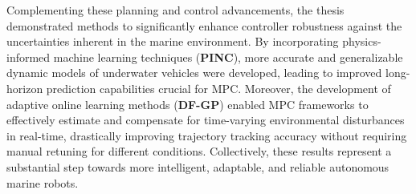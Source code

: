 Complementing these planning and control advancements, the thesis demonstrated methods to significantly enhance controller robustness against the uncertainties inherent in the marine environment. By incorporating physics-informed machine learning techniques (\textbf{PINC}), more accurate and generalizable dynamic models of underwater vehicles were developed, leading to improved long-horizon prediction capabilities crucial for \ac{MPC}. Moreover, the development of adaptive online learning methods (\textbf{DF-GP}) enabled \ac{MPC} frameworks to effectively estimate and compensate for time-varying environmental disturbances in real-time, drastically improving trajectory tracking accuracy  without requiring manual retuning for different conditions. Collectively, these results represent a substantial step towards more intelligent, adaptable, and reliable autonomous marine robots.